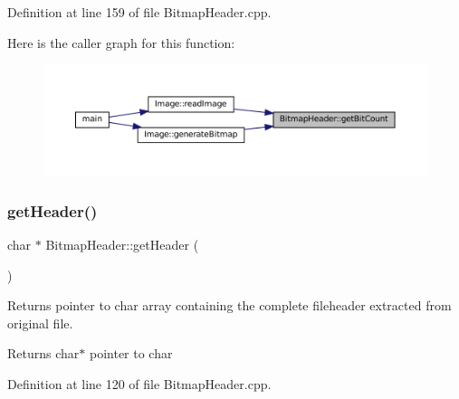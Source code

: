 Definition at line 159 of file Bitmap\+Header.\+cpp.

Here is the caller graph for this function\+:\nopagebreak
\begin{figure}[H]
\begin{center}
\leavevmode
\includegraphics[width=350pt]{classBitmapHeader_a2660782990f1d9547e0aef501f666969_icgraph}
\end{center}
\end{figure}
\mbox{\label{classBitmapHeader_aa29e1acc8a7a588867039d7c0bdcde04}} 
\subsubsection{\texorpdfstring{getHeader()}{getHeader()}}
{\footnotesize\ttfamily char $\ast$ Bitmap\+Header\+::get\+Header (\begin{DoxyParamCaption}{ }\end{DoxyParamCaption})}



Returns pointer to char array containing the complete fileheader extracted from original file. 

\begin{DoxyReturn}{Returns}
char$\ast$ pointer to char 
\end{DoxyReturn}


Definition at line 120 of file Bitmap\+Header.\+cpp.

